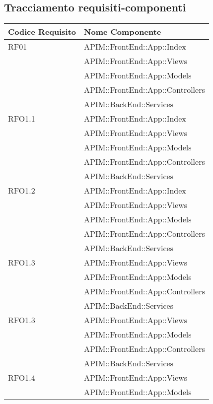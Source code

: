 		\newpage
		\subsection{Tracciamento requisiti-componenti}
		\begin{longtable}{ p{4cm} | p{12cm} }
			\hline \rowcolor{Gray}
			\textbf{Codice Requisito} & \textbf{Nome Componente} \\
			\hline
			
			RF01
			& APIM::FrontEnd::App::Index \\
			& APIM::FrontEnd::App::Views \\
			& APIM::FrontEnd::App::Models \\
			& APIM::FrontEnd::App::Controllers \\
			& APIM::BackEnd::Services \\
			\hline
			RFO1.1
			& APIM::FrontEnd::App::Index \\
			& APIM::FrontEnd::App::Views \\
			& APIM::FrontEnd::App::Models \\
			& APIM::FrontEnd::App::Controllers \\
			& APIM::BackEnd::Services \\
			\hline	
			RFO1.2
			& APIM::FrontEnd::App::Index \\
			& APIM::FrontEnd::App::Views \\
			& APIM::FrontEnd::App::Models \\
			& APIM::FrontEnd::App::Controllers \\
			& APIM::BackEnd::Services \\
			\hline
			RFO1.3
			& APIM::FrontEnd::App::Views \\
			& APIM::FrontEnd::App::Models \\
			& APIM::FrontEnd::App::Controllers \\
			& APIM::BackEnd::Services \\
			\hline		
			RFO1.3
			& APIM::FrontEnd::App::Views \\
			& APIM::FrontEnd::App::Models \\
			& APIM::FrontEnd::App::Controllers \\
			& APIM::BackEnd::Services \\
			\hline	
			RFO1.4
			& APIM::FrontEnd::App::Views \\
			& APIM::FrontEnd::App::Models \\

\end{longtable}
